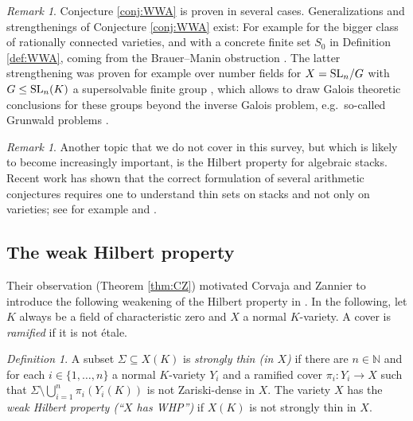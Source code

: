 \documentclass[10pt,a4paper]{amsart}
\theoremstyle{plain}
\theoremstyle{remark}
\newtheorem{definition}[theorem]{Definition}
\newtheorem{remark}[theorem]{Remark}
\newcommand{\ari}[1]{{\color{blue} \sf    [#1]}}
\numberwithin{theorem}{section}
\begin{document}
\begin{remark}
Conjecture \ref{conj:WWA} is proven in several cases. 
Generalizations and strengthenings of Conjecture \ref{conj:WWA} exist:
For example for the bigger class of rationally connected varieties,
and with a concrete finite set $S_0$ in Definition \ref{def:WWA}, coming from the Brauer--Manin obstruction \cite{CT_points_rationnels}.
The latter strengthening was proven for example over number fields for $X={\rm SL}_n/G$ with $G\leq{\rm SL}_n(K)$ a  supersolvable finite group \cite[Th\'eor\`eme B]{HW2},
which allows to draw Galois theoretic conclusions for these groups beyond the inverse Galois problem, e.g.~so-called Grunwald problems \cite[Corollaire p.~777]{HW2}.
\end{remark}

\begin{remark} 
Another topic that we do not cover in this survey, but which is likely to become increasingly important, is the Hilbert property for algebraic stacks. Recent work has shown that the correct formulation of several arithmetic conjectures requires one to understand thin sets on stacks and not only on varieties; see for example  \cite[Section~9]{DardaYasuda} and \cite[Sections~2.2, 3.7, 10.3 and 10.4]{LoughranSantens}. 
\end{remark}

 

\subsection{The weak Hilbert property}
Their observation (Theorem \ref{thm:CZ}) motivated Corvaja and Zannier to introduce the following weakening of the Hilbert property in \cite[Section 2.2]{CZ}.
In the following, 
let $K$ always be a field of characteristic zero
and $X$ a normal $K$-variety.
A cover is {\em ramified} if it is not \'etale.

 

\begin{definition} 
A subset $\Sigma\subseteq X(K)$ is \emph{strongly thin (in $X$)} if there are $n\in\mathbb{N}$
and for each $i\in\{1,\dots,n\}$ a normal $K$-variety $Y_i$ and a ramified cover $\pi_i\colon Y_i\to X$
such that $\Sigma \setminus \bigcup_{i=1}^n \pi_i(Y_i(K))$
is not Zariski-dense in $X$. 
The variety $X$ has the {\em weak Hilbert property (``$X$ has WHP'')} if $X(K)$ is not strongly thin in $X$. 
\end{definition}
\end{document}
